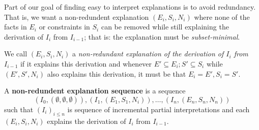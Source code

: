 Part of our goal of finding easy to interpret explanations is to avoid redundancy. 
That is, we want a non-redundent explanation $(E_i,S_i,N_i)$ where none of the facts in $E_i$ or constraints in $S_i$ can be removed while still explaining the derivation of $I_i$ from $I_{i-1}$; that is: the explanation must be \textit{subset-minimal}. 
\begin{definition}
 We call $(E_i,S_i,N_i)$ a \emph{non-redundant explanation of  the derivation of $I_i$ from $I_{i-1}$} if it explains this derivation and whenever $E'\subseteq E_i; S'\subseteq S_i$ while $(E',S',N_i)$ also explains this derivation, it must be that $E_i=E', S_i=S'$. 
\end{definition}

\begin{definition} \label{def:nonred}
A \textbf{non-redundent explanation sequence} is a sequence 
\[(I_0,(\emptyset,\emptyset,\emptyset)), (I_1,(E_1,S_1,N_i)), \dots ,(I_n,(E_n,S_n,N_n))\]
such that $(I_i)_{i\leq n}$ is sequence of incremental partial interpretations and each $(E_i,S_i,N_i)$ explains the derivation of $I_i$ from $I_{i-1}$.
\end{definition} 





